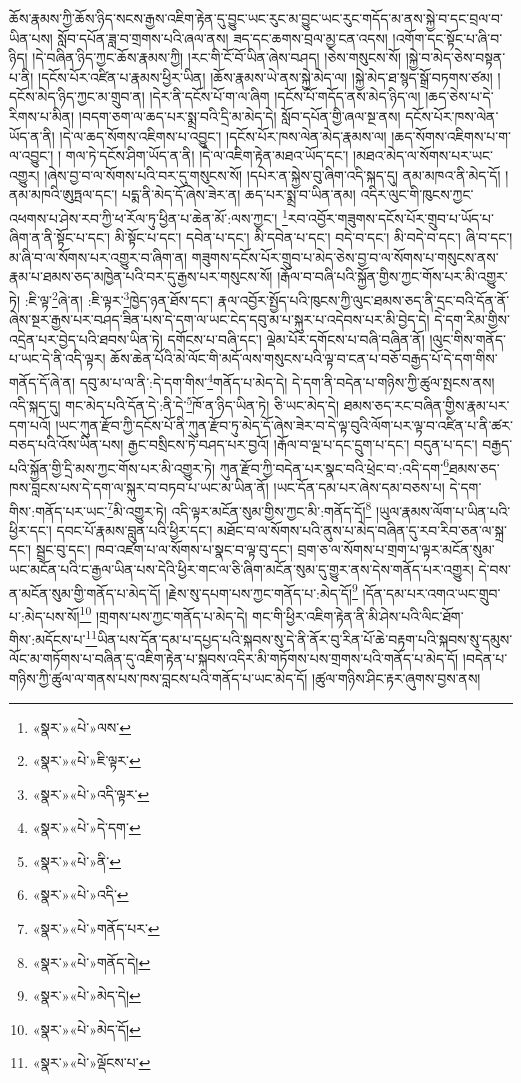 ཆོས་རྣམས་ཀྱི་ཆོས་ཉིད་སངས་རྒྱས་འཇིག་རྟེན་དུ་བྱུང་ཡང་རུང་མ་བྱུང་ཡང་རུང་གདོད་མ་ནས་སྐྱེ་བ་དང་བྲལ་བ་ཡིན་པས། སློབ་དཔོན་ཟླ་བ་གྲགས་པའི་ཞལ་ནས། ཟད་དང་ཆགས་བྲལ་མྱ་ངན་འདས། །འགོག་དང་སྟོང་པ་ཞི་བ་ཉིད། །དེ་བཞིན་ཉིད་ཀྱང་ཆོས་རྣམས་ཀྱི། །རང་གི་ངོ་བོ་ཡིན་ཞེས་བཤད། །ཅེས་གསུངས་སོ། །སྐྱེ་བ་མེད་ཅེས་བསྟན་པ་ནི། །དངོས་པོར་འཛིན་པ་རྣམས་ཕྱིར་ཡིན། །ཆོས་རྣམས་ཡེ་ནས་སྐྱེ་མེད་ལ། །སྐྱེ་མེད་ཐ་སྙད་སྒྲོ་བཏགས་ཙམ། །དངོས་མེད་ཉིད་ཀྱང་མ་གྲུབ་ན། །དེར་ནི་དངོས་པོ་ག་ལ་ཞིག །དངོས་པོ་གདོད་ནས་མེད་ཉིད་ལ། །ཆད་ཅེས་པ་དེ་རིགས་པ་མིན། །བདག་ཅག་ལ་ཆད་པར་སྨྲ་བའི་དྲི་མ་མེད་དེ། སློབ་དཔོན་གྱི་ཞལ་སྔ་ནས། དངོས་པོར་ཁས་ལེན་ཡོད་ན་ནི། །དེ་ལ་ཆད་སོགས་འཇིགས་པ་འབྱུང་། །དངོས་པོར་ཁས་ལེན་མེད་རྣམས་ལ། །ཆད་སོགས་འཇིགས་པ་ག་ལ་འབྱུང་། །
གལ་ཏེ་དངོས་ཤིག་ཡོད་ན་ནི། །དེ་ལ་འཇིག་རྟེན་མཐའ་ཡོད་དང་། །མཐའ་མེད་ལ་སོགས་པར་ཡང་འགྱུར། །ཞེས་བྱ་བ་ལ་སོགས་པའི་བར་དུ་གསུངས་སོ། །དཔེར་ན་སྐྱེས་བུ་ཞིག་འདི་སྐད་དུ། ནམ་མཁའ་ནི་མེད་དོ། །ནམ་མཁའི་ཨུཏྤལ་དང་། པདྨ་ནི་མེད་དོ་ཞེས་ཟེར་ན། ཆད་པར་སྨྲ་བ་ཡིན་ནམ། འདིར་ལུང་གི་ཁུངས་ཀྱང་འཕགས་པ་ཤེས་རབ་ཀྱི་ཕ་རོལ་ཏུ་ཕྱིན་པ་ཆེན་མོ་:ལས་ཀྱང་། \footnote{«སྣར་»«པེ་»ལས་}རབ་འབྱོར་གཟུགས་དངོས་པོར་གྲུབ་པ་ཡོད་པ་ཞིག་ན་ནི་སྟོང་པ་དང་། མི་སྟོང་པ་དང་། དབེན་པ་དང་། མི་དབེན་པ་དང་། བདེ་བ་དང་། མི་བདེ་བ་དང་། ཞི་བ་དང་། མ་ཞི་བ་ལ་སོགས་པར་འགྱུར་བ་ཞིག་ན། གཟུགས་དངོས་པོར་གྲུབ་པ་མེད་ཅེས་བྱ་བ་ལ་སོགས་པ་གསུངས་ནས་རྣམ་པ་ཐམས་ཅད་མཁྱེན་པའི་བར་དུ་རྒྱས་པར་གསུངས་སོ། །རྒོལ་བ་བཞི་པའི་སྐྱོན་གྱིས་ཀྱང་གོས་པར་མི་འགྱུར་ཏེ། :ཇི་ལྟ་\footnote{«སྣར་»«པེ་»ཇི་ལྟར་}ཞེ་ན། :ཇི་ལྟར་\footnote{«སྣར་»«པེ་»འདི་ལྟར་}ཁྱེད་ཉན་ཐོས་དང་། རྣལ་འབྱོར་སྤྱོད་པའི་ཁུངས་ཀྱི་ལུང་ཐམས་ཅད་ནི་དྲང་བའི་དོན་ནོ་ཞེས་སྔར་རྒྱས་པར་བཤད་ཟིན་པས་དེ་དག་ལ་ཡང་ངེད་དབུ་མ་པ་སྐུར་པ་འདེབས་པར་མི་བྱེད་དེ། དེ་དག་རིམ་གྱིས་འདྲེན་པར་བྱེད་པའི་ཐབས་ཡིན་ཏེ། དགོངས་པ་བཞི་དང་། ལྡེམ་པོར་དགོངས་པ་བཞི་བཞིན་ནོ། །ལུང་གིས་གནོད་པ་ཡང་དེ་ནི་འདི་ལྟར། ཆོས་ཆེན་པོའི་མེ་ལོང་གི་མདོ་ལས་གསུངས་པའི་ལྟ་བ་ངན་པ་བཅོ་བརྒྱད་པོ་དེ་དག་གིས་གནོད་དོ་ཞེ་ན། དབུ་མ་པ་ལ་ནི་:དེ་དག་གིས་\footnote{«སྣར་»«པེ་»དེ་དག་}གནོད་པ་མེད་དེ། དེ་དག་ནི་བདེན་པ་གཉིས་ཀྱི་ཚུལ་སྤངས་ནས། འདི་སྐད་དུ། གང་མེད་པའི་དོན་དེ་:ནི་དེ་\footnote{«སྣར་»«པེ་»ནི་}ཁོ་ན་ཉིད་ཡིན་ཏེ། ཅི་ཡང་མེད་དེ། ཐམས་ཅད་རང་བཞིན་གྱིས་རྣམ་པར་དག་པའོ། །ཡང་ཀུན་རྫོབ་ཀྱི་དངོས་པོ་ནི་ཀུན་རྫོབ་ཏུ་མེད་དོ་ཞེས་ཟེར་བ་དེ་ལྟ་བུའི་ལོག་པར་ལྟ་བ་འཛིན་པ་ནི་ཚར་བཅད་པའི་འོས་ཡིན་པས། རྒྱང་བསྲིངས་ཏེ་བཤད་པར་བྱའོ། །རྒོལ་བ་ལྔ་པ་དང་དྲུག་པ་དང་། བདུན་པ་དང་། བརྒྱད་པའི་སྐྱོན་གྱི་དྲི་མས་ཀྱང་གོས་པར་མི་འགྱུར་ཏེ། ཀུན་རྫོབ་ཀྱི་བདེན་པར་སྣང་བའི་ཕྲེང་བ་:འདི་དག་\footnote{«སྣར་»«པེ་»འདི་}ཐམས་ཅད་ཁས་བླངས་པས་དེ་དག་ལ་སྐུར་བ་བཏབ་པ་ཡང་མ་ཡིན་ནོ། །ཡང་དོན་དམ་པར་ཞེས་དམ་བཅས་པ། དེ་དག་གིས་:གནོད་པར་ཡང་\footnote{«སྣར་»«པེ་»གནོད་པར་}མི་འགྱུར་ཏེ། འདི་ལྟར་མངོན་སུམ་གྱིས་ཀྱང་མི་:གནོད་དོ།\footnote{«སྣར་»«པེ་»གནོད་དེ།} །ཡུལ་རྣམས་ལོག་པ་ཡིན་པའི་ཕྱིར་དང་། དབང་པོ་རྣམས་བླུན་པའི་ཕྱིར་དང་། མཐོང་བ་ལ་སོགས་པའི་ནུས་པ་མེད་བཞིན་དུ་རབ་རིབ་ཅན་ལ་སྐྲ་དང་། སྦྲང་བུ་དང་། ཁབ་འཛག་པ་ལ་སོགས་པ་སྣང་བ་ལྟ་བུ་དང་། བྲག་ཅ་ལ་སོགས་པ་གྲག་པ་ལྟར་མངོན་སུམ་ཡང་མངོན་པའི་ང་རྒྱལ་ཡིན་པས་དེའི་ཕྱིར་གང་ལ་ཅི་ཞིག་མངོན་སུམ་དུ་གྱུར་ནས་དེས་གནོད་པར་འགྱུར། དེ་བས་ན་མངོན་སུམ་གྱི་གནོད་པ་མེད་དོ། །རྗེས་སུ་དཔག་པས་ཀྱང་གནོད་པ་:མེད་དོ།\footnote{«སྣར་»«པེ་»མེད་དེ།} །དོན་དམ་པར་འགའ་ཡང་གྲུབ་པ་:མེད་པས་སོ།\footnote{«སྣར་»«པེ་»མེད་དོ།} །གྲགས་པས་ཀྱང་གནོད་པ་མེད་དེ། གང་གི་ཕྱིར་འཇིག་རྟེན་ནི་མི་ཤེས་པའི་ལིང་ཐོག་གིས་:མདོངས་པ་\footnote{«སྣར་»«པེ་»ལྡོངས་པ་}ཡིན་པས་དོན་དམ་པ་དཔྱད་པའི་སྐབས་སུ་དེ་ནི་ནོར་བུ་རིན་པོ་ཆེ་བརྟག་པའི་སྐབས་སུ་དམུས་ལོང་མ་གཏོགས་པ་བཞིན་དུ་འཇིག་རྟེན་པ་སྐབས་འདིར་མི་གཏོགས་པས་གྲགས་པའི་གནོད་པ་མེད་དོ། །བདེན་པ་གཉིས་ཀྱི་ཚུལ་ལ་གནས་པས་ཁས་བླངས་པའི་གནོད་པ་ཡང་མེད་དོ། །ཚུལ་གཉིས་ཤིང་རྟར་ཞུགས་བྱས་ནས། 